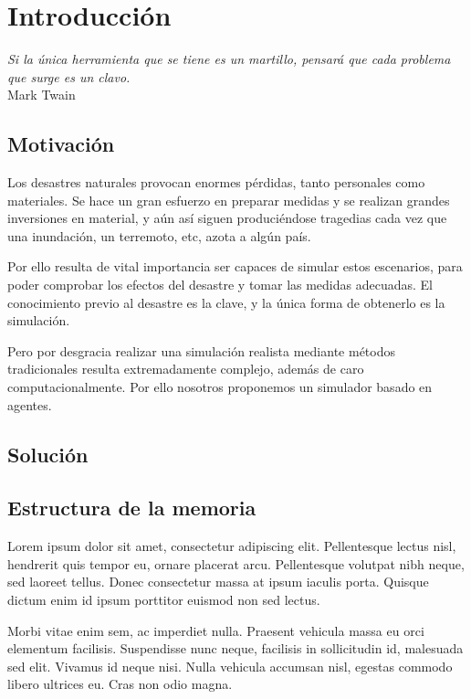 
\chapter*{Introducci\'on} \label{cap0}


\begin{flushright}
\begin{minipage}{7.85cm}
    {\em Si la única herramienta que se tiene es un martillo, pensará que cada
    problema que surge es un clavo.} \\  Mark Twain
\end{minipage}
\end{flushright}

\vspace*{5mm}

\section*{Motivación}

Los desastres naturales provocan enormes pérdidas, tanto personales como
materiales. Se hace un gran esfuerzo en preparar medidas y se realizan grandes
inversiones en material, y aún así siguen produciéndose tragedias cada vez que
una inundación, un terremoto, etc, azota a algún país.

Por ello resulta de vital importancia ser capaces de simular estos escenarios,
para poder comprobar los efectos del desastre y tomar las medidas adecuadas. El
conocimiento previo al desastre es la clave, y la única forma de obtenerlo es
la simulación.

Pero por desgracia realizar una simulación realista mediante métodos
tradicionales resulta extremadamente complejo, además de caro
computacionalmente. Por ello nosotros proponemos un simulador basado en agentes.

\section*{Solución}



\section*{Estructura de la memoria}

Lorem ipsum dolor sit amet, consectetur adipiscing elit. Pellentesque lectus
nisl, hendrerit quis tempor eu,
ornare placerat arcu. Pellentesque volutpat nibh
neque, sed laoreet tellus. Donec consectetur massa
 at ipsum iaculis porta.
Quisque dictum enim id ipsum porttitor euismod non sed lectus.

Morbi vitae enim sem, ac imperdiet nulla. Praesent vehicula massa eu orci
elementum facilisis. Suspendisse nunc neque, facilisis in sollicitudin id,
malesuada sed elit. Vivamus id neque nisi. Nulla vehicula accumsan nisl, egestas
commodo libero ultrices eu. Cras non odio magna.